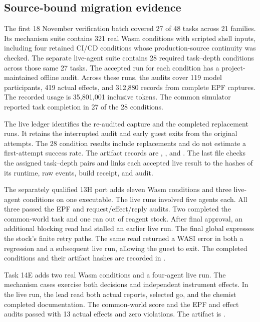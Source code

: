 \documentclass[10pt]{article}
\begin{document}
\subsection{Source-bound migration evidence}
The first 18 November verification batch covered 27 of 48 tasks across 21
families. Its mechanism suite contains 321 real Wasm conditions with
scripted shell inputs, including four retained CI/CD conditions whose
production-source continuity was checked. The separate live-agent suite
contains 28 required task--depth conditions across those same 27 tasks. The
accepted run for each condition has a project-maintained offline audit. Across these runs,
the audits cover 119 model participants, 419 actual effects, and 312,880 records
from complete EPF captures. The recorded usage is 35,801,001 inclusive tokens.
The common simulator reported task completion in 27 of the 28 conditions.

The live ledger identifies the re-audited capture and the completed replacement
runs. It retains the interrupted audit and early guest exits from the original
attempts. The 28 condition results include replacements and do not estimate a
first-attempt success rate. The artifact records are
,
,
and .
The last file checks the assigned task--depth pairs and links each accepted live
result to the hashes of its runtime, raw events, build receipt, and audit.

The separately qualified 13H port adds eleven Wasm conditions and three
live-agent conditions on one executable. The live runs involved five agents
each. All three passed the EPF and request/effect/reply audits. Two completed
the common-world task and one ran out of reagent stock. After final approval,
an additional blocking read had stalled an earlier live run. The final global
expresses the stock's finite retry paths. The same read returned a WASI error
in both a regression and a subsequent live run, allowing the guest to exit.
The completed conditions and their artifact hashes are recorded in
.

Task 14E adds two real Wasm conditions and a four-agent live run. The
mechanism cases exercise both decisions and independent instrument effects.
In the live run, the lead read both actual reports, selected go, and the
chemist completed documentation. The common-world score and the EPF and
effect audits passed with 13 actual effects and zero violations.
The artifact is
.
\end{document}
